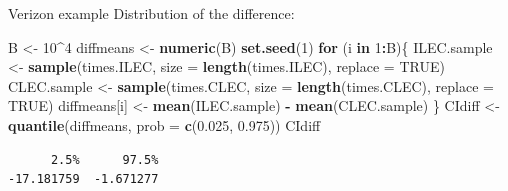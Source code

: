 \documentclass[
  ignorenonframetext,
]{beamer}
\newenvironment{Shaded}{\begin{snugshade}}{\end{snugshade}}
\newcommand{\AttributeTok}[1]{\textcolor[rgb]{0.13,0.29,0.53}{#1}}
\newcommand{\ConstantTok}[1]{\textcolor[rgb]{0.56,0.35,0.01}{#1}}
\newcommand{\ControlFlowTok}[1]{\textcolor[rgb]{0.13,0.29,0.53}{\textbf{#1}}}
\newcommand{\DecValTok}[1]{\textcolor[rgb]{0.00,0.00,0.81}{#1}}
\newcommand{\FloatTok}[1]{\textcolor[rgb]{0.00,0.00,0.81}{#1}}
\newcommand{\FunctionTok}[1]{\textcolor[rgb]{0.13,0.29,0.53}{\textbf{#1}}}
\newcommand{\NormalTok}[1]{#1}
\newcommand{\OtherTok}[1]{\textcolor[rgb]{0.56,0.35,0.01}{#1}}
\newcommand{\SpecialCharTok}[1]{\textcolor[rgb]{0.81,0.36,0.00}{\textbf{#1}}}
\begin{document}
\begin{frame}[fragile]{Verizon example}
\label{verizon-example-6}
Distribution of the difference:

\small

\begin{Shaded}
\begin{Highlighting}[]
\NormalTok{B }\OtherTok{\textless{}{-}} \DecValTok{10}\SpecialCharTok{\^{}}\DecValTok{4}
\NormalTok{diffmeans }\OtherTok{\textless{}{-}} \FunctionTok{numeric}\NormalTok{(B)}
\FunctionTok{set.seed}\NormalTok{(}\DecValTok{1}\NormalTok{)}
\ControlFlowTok{for}\NormalTok{ (i }\ControlFlowTok{in} \DecValTok{1}\SpecialCharTok{:}\NormalTok{B)\{}
\NormalTok{  ILEC.sample }\OtherTok{\textless{}{-}} \FunctionTok{sample}\NormalTok{(times.ILEC, }\AttributeTok{size =} \FunctionTok{length}\NormalTok{(times.ILEC), }
                        \AttributeTok{replace =} \ConstantTok{TRUE}\NormalTok{)}
\NormalTok{  CLEC.sample }\OtherTok{\textless{}{-}} \FunctionTok{sample}\NormalTok{(times.CLEC, }\AttributeTok{size =} \FunctionTok{length}\NormalTok{(times.CLEC), }
                        \AttributeTok{replace =} \ConstantTok{TRUE}\NormalTok{)}
\NormalTok{  diffmeans[i] }\OtherTok{\textless{}{-}} \FunctionTok{mean}\NormalTok{(ILEC.sample) }\SpecialCharTok{{-}} \FunctionTok{mean}\NormalTok{(CLEC.sample)}
\NormalTok{\}}
\NormalTok{CIdiff }\OtherTok{\textless{}{-}} \FunctionTok{quantile}\NormalTok{(diffmeans, }\AttributeTok{prob =} \FunctionTok{c}\NormalTok{(}\FloatTok{0.025}\NormalTok{, }\FloatTok{0.975}\NormalTok{))}
\NormalTok{CIdiff}
\end{Highlighting}
\end{Shaded}

\begin{verbatim}
      2.5%      97.5% 
-17.181759  -1.671277 
\end{verbatim}

\normalsize
\end{frame}
\end{document}
